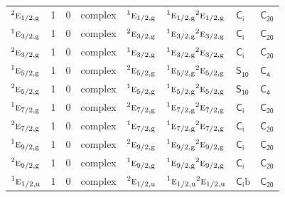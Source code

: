 \documentclass[10pt,a4paper]{article}
\numberwithin{equation}{section}
\newcommand{\grp}[1]{\mathsf{#1}}
\newcommand{\irr}[1]{\text{\normalfont\scshape #1}}
\newcommand{\conjpair}[1]{{}^{#1}}
\newcommand{\ptag}[1]{\mathrm{#1}}
\newcommand{\secondclass}{\mathrm{b}}
\begin{document}
{\begin{longtable}{@{}lrrlllll@{}}
$\conjpair{2}\irr{e}_{1/2,\ptag{g}}$ & 1 & $0$ & complex & $\conjpair{1}\irr{e}_{1/2,\ptag{g}}$ & $\conjpair{1}\irr{e}_{1/2,\ptag{g}}\conjpair{2}\irr{e}_{1/2,\ptag{g}}$ & \href{S2.pdf}{$\grp{C_{i}}$} & $\grp{C_{20}}$\\
$\conjpair{1}\irr{e}_{3/2,\ptag{g}}$ & 1 & $0$ & complex & $\conjpair{2}\irr{e}_{3/2,\ptag{g}}$ & $\conjpair{1}\irr{e}_{3/2,\ptag{g}}\conjpair{2}\irr{e}_{3/2,\ptag{g}}$ & \href{S2.pdf}{$\grp{C_{i}}$} & $\grp{C_{20}}$\\
$\conjpair{2}\irr{e}_{3/2,\ptag{g}}$ & 1 & $0$ & complex & $\conjpair{1}\irr{e}_{3/2,\ptag{g}}$ & $\conjpair{1}\irr{e}_{3/2,\ptag{g}}\conjpair{2}\irr{e}_{3/2,\ptag{g}}$ & \href{S2.pdf}{$\grp{C_{i}}$} & $\grp{C_{20}}$\\
$\conjpair{1}\irr{e}_{5/2,\ptag{g}}$ & 1 & $0$ & complex & $\conjpair{2}\irr{e}_{5/2,\ptag{g}}$ & $\conjpair{1}\irr{e}_{5/2,\ptag{g}}\conjpair{2}\irr{e}_{5/2,\ptag{g}}$ & \href{S10.pdf}{$\grp{S_{10}}$} & \href{../../../rotation/data/pdf/C4.pdf}{$\grp{C_{4}}$}\\
$\conjpair{2}\irr{e}_{5/2,\ptag{g}}$ & 1 & $0$ & complex & $\conjpair{1}\irr{e}_{5/2,\ptag{g}}$ & $\conjpair{1}\irr{e}_{5/2,\ptag{g}}\conjpair{2}\irr{e}_{5/2,\ptag{g}}$ & \href{S10.pdf}{$\grp{S_{10}}$} & \href{../../../rotation/data/pdf/C4.pdf}{$\grp{C_{4}}$}\\
$\conjpair{1}\irr{e}_{7/2,\ptag{g}}$ & 1 & $0$ & complex & $\conjpair{2}\irr{e}_{7/2,\ptag{g}}$ & $\conjpair{1}\irr{e}_{7/2,\ptag{g}}\conjpair{2}\irr{e}_{7/2,\ptag{g}}$ & \href{S2.pdf}{$\grp{C_{i}}$} & $\grp{C_{20}}$\\
$\conjpair{2}\irr{e}_{7/2,\ptag{g}}$ & 1 & $0$ & complex & $\conjpair{1}\irr{e}_{7/2,\ptag{g}}$ & $\conjpair{1}\irr{e}_{7/2,\ptag{g}}\conjpair{2}\irr{e}_{7/2,\ptag{g}}$ & \href{S2.pdf}{$\grp{C_{i}}$} & $\grp{C_{20}}$\\
$\conjpair{1}\irr{e}_{9/2,\ptag{g}}$ & 1 & $0$ & complex & $\conjpair{2}\irr{e}_{9/2,\ptag{g}}$ & $\conjpair{1}\irr{e}_{9/2,\ptag{g}}\conjpair{2}\irr{e}_{9/2,\ptag{g}}$ & \href{S2.pdf}{$\grp{C_{i}}$} & $\grp{C_{20}}$\\
$\conjpair{2}\irr{e}_{9/2,\ptag{g}}$ & 1 & $0$ & complex & $\conjpair{1}\irr{e}_{9/2,\ptag{g}}$ & $\conjpair{1}\irr{e}_{9/2,\ptag{g}}\conjpair{2}\irr{e}_{9/2,\ptag{g}}$ & \href{S2.pdf}{$\grp{C_{i}}$} & $\grp{C_{20}}$\\
$\conjpair{1}\irr{e}_{1/2,\ptag{u}}$ & 1 & $0$ & complex & $\conjpair{2}\irr{e}_{1/2,\ptag{u}}$ & $\conjpair{1}\irr{e}_{1/2,\ptag{u}}\conjpair{2}\irr{e}_{1/2,\ptag{u}}$ & \href{S2b.pdf}{$\grp{C_{i}}\secondclass$} & $\grp{C_{20}}$\\

\end{longtable}}
\end{document}
